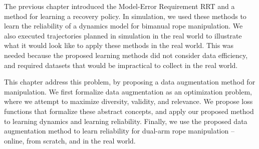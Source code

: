 The previous chapter introduced the Model-Error Requirement RRT and a method for learning a recovery policy. In simulation, we used these methods to learn the reliability of a dynamics model for bimanual rope manipulation. We also executed trajectories planned in simulation in the real world to illustrate what it would look like to apply these methods in the real world. This was needed because the proposed learning methods did not consider data efficiency, and required datasets that would be impractical to collect in the real world.

This chapter address this problem, by proposing a data augmentation method for manipulation. We first formalize data augmentation as an optimization problem, where we attempt to maximize diversity, validity, and relevance. We propose loss functions that formalize these abstract concepts, and apply our proposed method to learning dynamics and learning reliability. Finally, we use the proposed data augmentation method to learn reliability for dual-arm rope manipulation -- online, from scratch, and in the real world.








